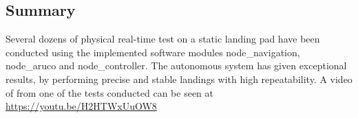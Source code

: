 \subsection{Summary} %
\label{sub:controller_summary}
Several dozens of physical real-time test on a static landing pad have been conducted using the implemented software modules node\_navigation, node\_aruco and node\_controller. The autonomous system has given exceptional results, by performing precise and stable landings with high repeatability. A video of from one of the tests conducted can be seen at \url{https://youtu.be/H2HTWxUuOW8}
